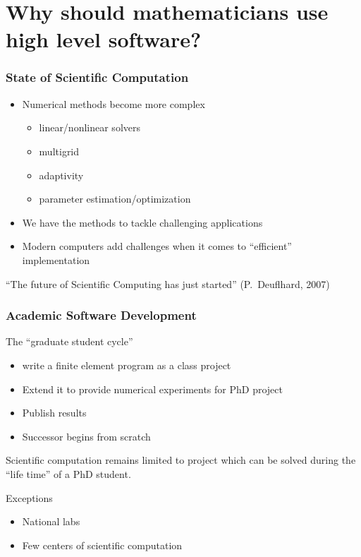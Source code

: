 \section[Why Software?]{Why should mathematicians use high level software?}

\begin{frame}
  \frametitle{State of Scientific Computation}
  \begin{itemize}
  \item Numerical methods become more complex
    \begin{itemize}
    \item linear/nonlinear solvers
    \item multigrid
    \item adaptivity
    \item parameter estimation/optimization
    \end{itemize}
  \item We have the methods to tackle challenging applications
  \item Modern computers add challenges when it comes to ``efficient''
    implementation
  \end{itemize}
  \pause
  \begin{block}{}
``The future of Scientific Computing has just started'' (P.~Deuflhard, 2007)    
  \end{block}

\end{frame}

\begin{frame}
  \frametitle{Academic Software Development}
  The ``graduate student cycle''
  \begin{itemize}
  \item write a finite element program as a class project
  \item Extend it to provide numerical experiments for PhD project
  \item Publish results
  \item Successor begins from scratch
  \end{itemize}
  \pause
  \begin{block}{}
    Scientific computation remains limited to project which can be
    solved during the ``life time'' of a PhD student.
  \end{block}
  \pause
  Exceptions
  \begin{itemize}
  \item National labs
  \item Few centers of scientific computation
  \end{itemize}
\end{frame}

